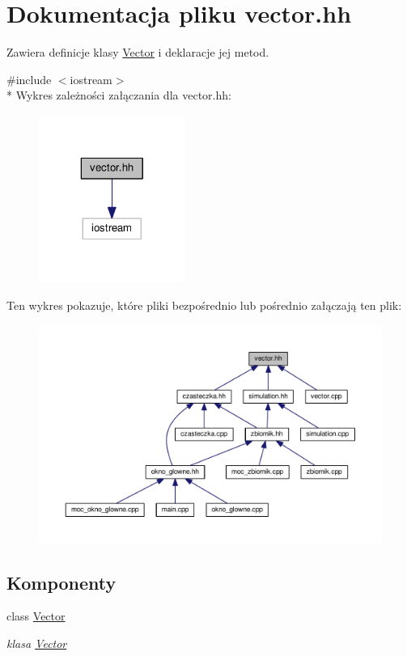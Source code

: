 \hypertarget{vector_8hh}{\section{Dokumentacja pliku vector.\-hh}
\label{vector_8hh}
}


Zawiera definicje klasy \hyperlink{class_vector}{Vector} i deklaracje jej metod.  


{\ttfamily \#include $<$iostream$>$}\\*
Wykres zależności załączania dla vector.\-hh\-:\nopagebreak
\begin{figure}[H]
\begin{center}
\leavevmode
\includegraphics[width=136pt]{vector_8hh__incl}
\end{center}
\end{figure}
Ten wykres pokazuje, które pliki bezpośrednio lub pośrednio załączają ten plik\-:\nopagebreak
\begin{figure}[H]
\begin{center}
\leavevmode
\includegraphics[width=350pt]{vector_8hh__dep__incl}
\end{center}
\end{figure}
\subsection*{Komponenty}
\begin{DoxyCompactItemize}
\item 
class \hyperlink{class_vector}{Vector}
\begin{DoxyCompactList}\small\item\em klasa \hyperlink{class_vector}{Vector} \end{DoxyCompactList}\end{DoxyCompactItemize}



